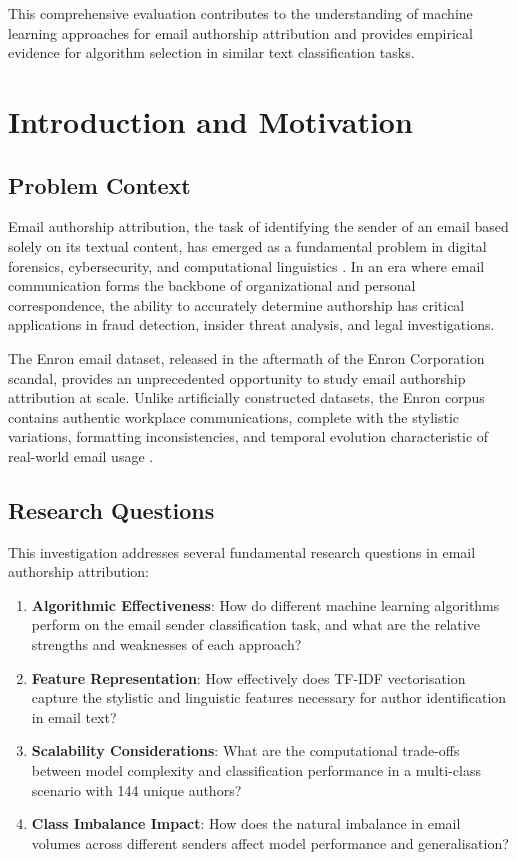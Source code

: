 \documentclass[11pt,a4paper]{article}
\begin{document}
This comprehensive evaluation contributes to the understanding of machine learning approaches for email authorship attribution and provides empirical evidence for algorithm selection in similar text classification tasks.

\section{Introduction and Motivation}

\subsection{Problem Context}

Email authorship attribution, the task of identifying the sender of an email based solely on its textual content, has emerged as a fundamental problem in digital forensics, cybersecurity, and computational linguistics \cite{abbasi2008writeprints, zheng2006authorship}. In an era where email communication forms the backbone of organizational and personal correspondence, the ability to accurately determine authorship has critical applications in fraud detection, insider threat analysis, and legal investigations.

The Enron email dataset, released in the aftermath of the Enron Corporation scandal, provides an unprecedented opportunity to study email authorship attribution at scale. Unlike artificially constructed datasets, the Enron corpus contains authentic workplace communications, complete with the stylistic variations, formatting inconsistencies, and temporal evolution characteristic of real-world email usage \cite{klimt2004enron}.

\subsection{Research Questions}

This investigation addresses several fundamental research questions in email authorship attribution:

\begin{enumerate}
    \item \textbf{Algorithmic Effectiveness}: How do different machine learning algorithms perform on the email sender classification task, and what are the relative strengths and weaknesses of each approach?
    
    \item \textbf{Feature Representation}: How effectively does TF-IDF vectorisation capture the stylistic and linguistic features necessary for author identification in email text?
    
    \item \textbf{Scalability Considerations}: What are the computational trade-offs between model complexity and classification performance in a multi-class scenario with 144 unique authors?
    
    \item \textbf{Class Imbalance Impact}: How does the natural imbalance in email volumes across different senders affect model performance and generalisation?
\end{enumerate}
\end{document}
